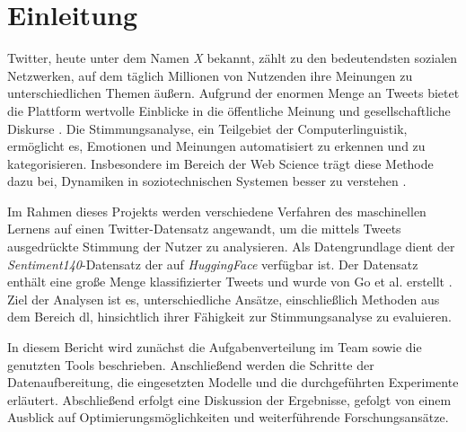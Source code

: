 \section{Einleitung}\label{sec:einleitung}

Twitter, heute unter dem Namen \textit{X} bekannt, zählt zu den bedeutendsten sozialen Netzwerken, auf dem täglich Millionen von Nutzenden ihre Meinungen zu unterschiedlichen Themen äußern.
Aufgrund der enormen Menge an Tweets bietet die Plattform wertvolle Einblicke in die öffentliche Meinung und gesellschaftliche Diskurse \cite{pak2010twitter}.
Die Stimmungsanalyse, ein Teilgebiet der Computerlinguistik, ermöglicht es, Emotionen und Meinungen automatisiert zu erkennen und zu kategorisieren.
Insbesondere im Bereich der Web Science trägt diese Methode dazu bei, Dynamiken in soziotechnischen Systemen besser zu verstehen \cite{berners2006web, liu2012sentiment}.

Im Rahmen dieses Projekts werden verschiedene Verfahren des maschinellen Lernens auf einen Twitter-Datensatz angewandt, um die mittels Tweets ausgedrückte Stimmung der Nutzer zu analysieren.
Als Datengrundlage dient der \textit{Sentiment140}-Datensatz der auf \textit{HuggingFace} \cite{sentiment1402023huggingface} verfügbar ist.
Der Datensatz enthält eine große Menge klassifizierter Tweets und wurde von Go et al. erstellt \cite{go2009twitter}.
Ziel der Analysen ist es, unterschiedliche Ansätze, einschließlich Methoden aus dem Bereich \gls{dl}, hinsichtlich ihrer Fähigkeit zur Stimmungsanalyse zu evaluieren.

In diesem Bericht wird zunächst die Aufgabenverteilung im Team sowie die genutzten Tools beschrieben.
Anschließend werden die Schritte der Datenaufbereitung, die eingesetzten Modelle und die durchgeführten Experimente erläutert.
Abschließend erfolgt eine Diskussion der Ergebnisse, gefolgt von einem Ausblick auf Optimierungsmöglichkeiten und weiterführende Forschungsansätze.
